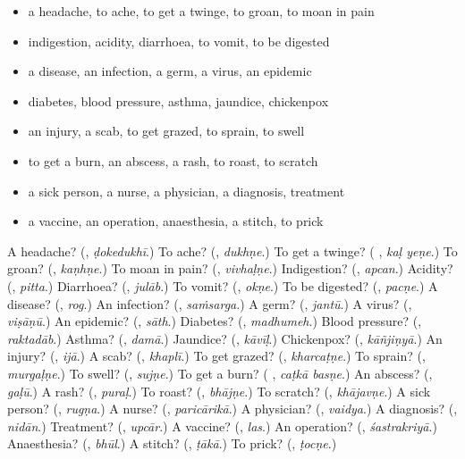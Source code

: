 \begin{itemize}
\raggedright
  \item a headache, to ache, to get a twinge, to groan, to moan in pain
  \item indigestion, acidity, diarrhoea, to vomit, to be digested
  \item a disease, an infection, a germ, a virus, an epidemic
  \item diabetes, blood pressure, asthma, jaundice, chickenpox
  \item an injury, a scab, to get grazed, to sprain, to swell
  \item to get a burn, an abscess, a rash, to roast, to scratch
  \item a sick person, a nurse, a physician, a diagnosis, treatment
  \item a vaccine, an operation, anaesthesia, a stitch, to prick
\end{itemize}

\begin{tcolorbox}[breakable,colback=teal!4,colframe=teal!35!black,title={Before you move on}]
A headache? (\textbf{}, \emph{ḍokedukhī}.) To ache? (\textbf{}, \emph{dukhṇe}.) To get a twinge? (\textbf{ }, \emph{kaḷ yeṇe}.) To groan? (\textbf{}, \emph{kaṇhṇe}.) To moan in pain? (\textbf{}, \emph{vivhaḷṇe}.) Indigestion? (\textbf{}, \emph{apcan}.) Acidity? (\textbf{}, \emph{pitta}.) Diarrhoea? (\textbf{}, \emph{julāb}.) To vomit? (\textbf{}, \emph{okṇe}.) To be digested? (\textbf{}, \emph{pacṇe}.) A disease? (\textbf{}, \emph{rog}.) An infection? (\textbf{}, \emph{saṁsarga}.) A germ? (\textbf{}, \emph{jantū}.) A virus? (\textbf{}, \emph{viṣāṇū}.) An epidemic? (\textbf{}, \emph{sāth}.) Diabetes? (\textbf{}, \emph{madhumeh}.) Blood pressure? (\textbf{}, \emph{raktadāb}.) Asthma? (\textbf{}, \emph{damā}.) Jaundice? (\textbf{}, \emph{kāvīḷ}.) Chickenpox? (\textbf{}, \emph{kāñjiṇyā}.) An injury? (\textbf{}, \emph{ijā}.) A scab? (\textbf{}, \emph{khaplī}.) To get grazed? (\textbf{}, \emph{kharcaṭṇe}.) To sprain? (\textbf{}, \emph{murgaḷṇe}.) To swell? (\textbf{}, \emph{sujṇe}.) To get a burn? (\textbf{ }, \emph{caṭkā basṇe}.) An abscess? (\textbf{}, \emph{gaḷū}.) A rash? (\textbf{}, \emph{puraḷ}.) To roast? (\textbf{}, \emph{bhājṇe}.) To scratch? (\textbf{}, \emph{khājavṇe}.) A sick person? (\textbf{}, \emph{rugṇa}.) A nurse? (\textbf{}, \emph{paricārikā}.) A physician? (\textbf{}, \emph{vaidya}.) A diagnosis? (\textbf{}, \emph{nidān}.) Treatment? (\textbf{}, \emph{upcār}.) A vaccine? (\textbf{}, \emph{las}.) An operation? (\textbf{}, \emph{śastrakriyā}.) Anaesthesia? (\textbf{}, \emph{bhūl}.) A stitch? (\textbf{}, \emph{ṭākā}.) To prick? (\textbf{}, \emph{ṭocṇe}.)
\end{tcolorbox}
